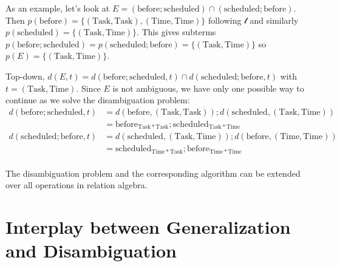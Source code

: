 \documentclass[12pt]{article}
\begin{document}
As an example, let's look at $E = (\mathrm{before};\mathrm{scheduled}) \cap (\mathrm{scheduled};\mathrm{before})$.
Then $p(\mathrm{before}) =  \{(\mathrm{Task}, \mathrm{Task}),(\mathrm{Time}, \mathrm{Time})\}$ following $\mathcal{t}$ and similarly $p(\mathrm{scheduled}) = \{(\mathrm{Task}, \mathrm{Time})\}$.
This gives subterms $p(\mathrm{before};\mathrm{scheduled}) = p(\mathrm{scheduled};\mathrm{before}) = \{(\mathrm{Task}, \mathrm{Time})\}$ so $p(E) = \{(\mathrm{Task}, \mathrm{Time})\}$.

Top-down, $d(E,t) = d(\mathrm{before};\mathrm{scheduled},t) \cap d(\mathrm{scheduled};\mathrm{before},t)$ with $t=(\mathrm{Task}, \mathrm{Time})$.
Since $E$ is not ambiguous, we have only one possible way to continue as we solve the disambiguation problem:
\begin{align*}d(\mathrm{before};\mathrm{scheduled},t) &= d(\mathrm{before},(\mathrm{Task}, \mathrm{Task})) ;  d(\mathrm{scheduled},(\mathrm{Task}, \mathrm{Time})) \\
&=\mathrm{before}_{\mathrm{Task} * \mathrm{Task}}; \mathrm{scheduled}_{\mathrm{Task}* \mathrm{Time}}\\
d(\mathrm{scheduled};\mathrm{before},t) &=  d(\mathrm{scheduled},(\mathrm{Task}, \mathrm{Time}));d(\mathrm{before},(\mathrm{Time}, \mathrm{Time}))\\
&=\mathrm{scheduled}_{\mathrm{Time} * \mathrm{Task}}; \mathrm{before}_{\mathrm{Time}* \mathrm{Time}}\\
\end{align*}

The disambiguation problem and the corresponding algorithm can be extended over all operations in relation algebra.

\section{Interplay between Generalization and Disambiguation}

\end{document}
